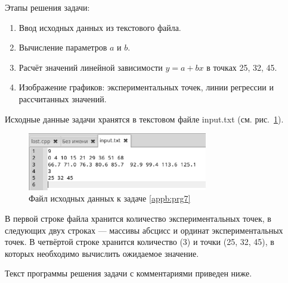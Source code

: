 Этапы решения задачи:

\begin{enumerate}
\item Ввод исходных данных из текстового файла.
\item Вычисление параметров $a$ и $b$.
\item Расчёт значений линейной зависимости  $y=a+bx$ в точках  25, 32, 45.
\item Изображение графиков: экспериментальных точек, линии регрессии и рассчитанных значений.
\end{enumerate}

Исходные данные задачи хранятся в текстовом файле input.txt (см. рис.~\ref{appb:refDrawing8}).

\begin{figure}[htb]
\begin{center}
\includegraphics[width=0.7\textwidth]{img/ris_appb_10}
\caption{Файл исходных данных к задаче \ref{appb:prg7}}
\label{appb:refDrawing8}
\end{center}
\end{figure}

В первой строке файла хранится количество экспериментальных точек, в следующих двух 
строках --- массивы абсцисс и ординат
экспериментальных точек. В четвёртой строке хранится количество (3) и 
точки (25, 32, 45), в которых необходимо
вычислить ожидаемое значение.

Текст программы решения задачи с комментариями приведен ниже.

